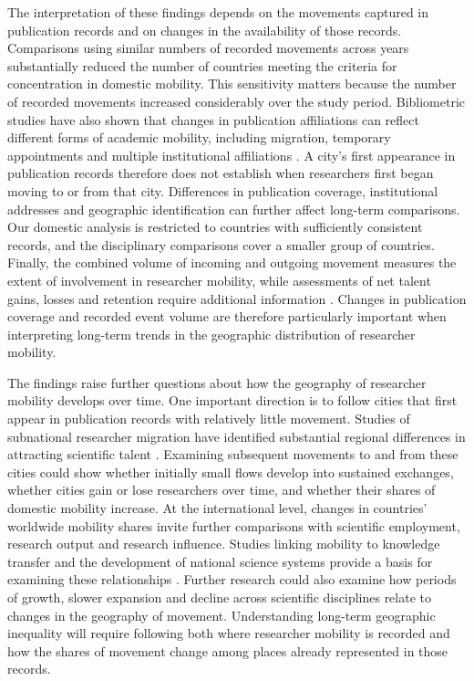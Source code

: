 The interpretation of these findings depends on the movements captured in publication records and on changes in the availability of those records. Comparisons using similar numbers of recorded movements across years substantially reduced the number of countries meeting the criteria for concentration in domestic mobility. This sensitivity matters because the number of recorded movements increased considerably over the study period. Bibliometric studies have also shown that changes in publication affiliations can reflect different forms of academic mobility, including migration, temporary appointments and multiple institutional affiliations \cite{ref022,ref004}. A city's first appearance in publication records therefore does not establish when researchers first began moving to or from that city. Differences in publication coverage, institutional addresses and geographic identification can further affect long-term comparisons. Our domestic analysis is restricted to countries with sufficiently consistent records, and the disciplinary comparisons cover a smaller group of countries. Finally, the combined volume of incoming and outgoing movement measures the extent of involvement in researcher mobility, while assessments of net talent gains, losses and retention require additional information \cite{ref041,ref034}. Changes in publication coverage and recorded event volume are therefore particularly important when interpreting long-term trends in the geographic distribution of researcher mobility.

The findings raise further questions about how the geography of researcher mobility develops over time. One important direction is to follow cities that first appear in publication records with relatively little movement. Studies of subnational researcher migration have identified substantial regional differences in attracting scientific talent \cite{ref029}. Examining subsequent movements to and from these cities could show whether initially small flows develop into sustained exchanges, whether cities gain or lose researchers over time, and whether their shares of domestic mobility increase. At the international level, changes in countries' worldwide mobility shares invite further comparisons with scientific employment, research output and research influence. Studies linking mobility to knowledge transfer and the development of national science systems provide a basis for examining these relationships \cite{ref006,ref040}. Further research could also examine how periods of growth, slower expansion and decline across scientific disciplines relate to changes in the geography of movement. Understanding long-term geographic inequality will require following both where researcher mobility is recorded and how the shares of movement change among places already represented in those records.
